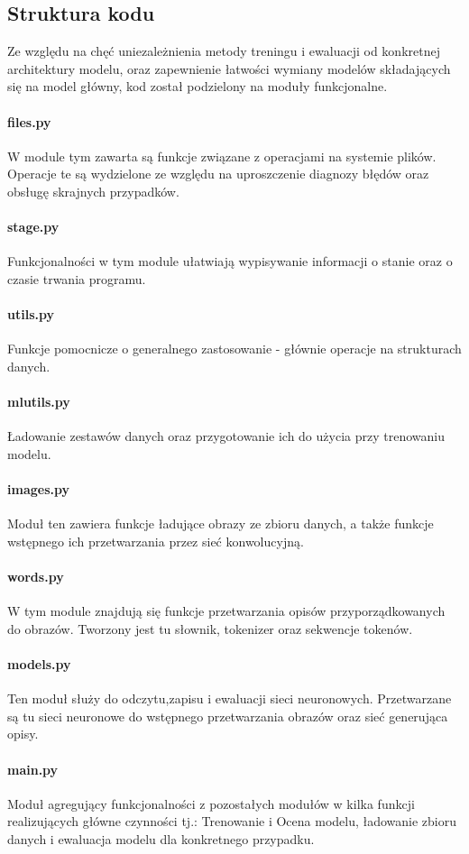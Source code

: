 \subsection{Struktura kodu}
Ze względu na chęć uniezależnienia metody treningu i ewaluacji od konkretnej architektury modelu, oraz zapewnienie łatwości wymiany modelów składających się na model główny, kod został podzielony na moduły funkcjonalne.
\paragraph*{files.py} W module tym zawarta są funkcje związane z operacjami na systemie plików. Operacje te są wydzielone ze względu na uproszczenie diagnozy błędów oraz obsługę skrajnych przypadków.
\paragraph*{stage.py} Funkcjonalności w tym module ułatwiają wypisywanie informacji o stanie oraz o czasie trwania programu.
\paragraph*{utils.py} Funkcje pomocnicze o generalnego zastosowanie - głównie operacje na strukturach danych.
\paragraph*{mlutils.py} Ładowanie zestawów danych oraz przygotowanie ich do użycia przy trenowaniu modelu.
\paragraph*{images.py} Moduł ten zawiera funkcje ładujące obrazy ze zbioru danych, a także funkcje wstępnego ich przetwarzania przez sieć konwolucyjną.
\paragraph*{words.py} W tym module znajdują się funkcje przetwarzania opisów przyporządkowanych do obrazów. Tworzony jest tu słownik, tokenizer oraz sekwencje tokenów.
\paragraph*{models.py} Ten moduł służy do odczytu,zapisu i ewaluacji sieci neuronowych. Przetwarzane są tu sieci neuronowe do wstępnego przetwarzania obrazów oraz sieć generująca opisy.  
\paragraph*{main.py} Moduł agregujący funkcjonalności z pozostałych modułów w kilka funkcji realizujących główne czynności tj.: Trenowanie i Ocena modelu, ładowanie zbioru danych i ewaluacja modelu dla konkretnego przypadku.

